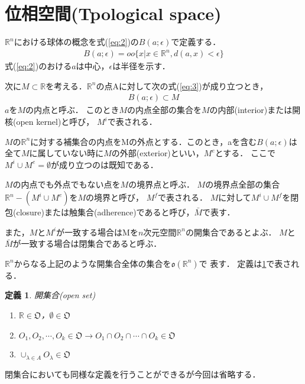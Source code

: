 \documentclass[11pt,a4j]{jarticle}
\newtheorem{dfn}{定義}
\begin{document}
\section{位相空間(Tpological space)} 
$\mathbb{R}^n$における球体の概念を式(\ref{eq:2})の$B(a;\epsilon)$で定義する．
\begin{eqnarray}
    \label{eq:2}
    B(a;\epsilon)=oo\{x|x\in \mathbb{R}^n,d(a,x)<\epsilon\}
\end{eqnarray}
式(\ref{eq:2})のおける$a$は中心，$\epsilon$は半径を示す．

次に$M\subset \mathbb{R}$を考える．$\mathbb{R}^n$の点Aに対して次の式(\ref{eq:3})が成り立つとき，
\begin{eqnarray}
    \label{eq:3}
    B(a;\epsilon) \subset M
\end{eqnarray}
$a$を$M$の内点と呼ぶ．
このとき$M$の内点全部の集合を$M$の内部(interior)または開核(open kernel)と呼び，
$M^i$で表される．

$M$の$\mathbb{R}^n$に対する補集合の内点をMの外点とする．このとき，aを含む$B(a;\epsilon)$は
全て$M$に属していない時に$M$の外部(exterior)といい，$M^e$とする．
ここで$M^i \cup M^e = \emptyset$が成り立つのは既知である．

$M$の内点でも外点でもない点を$M$の境界点と呼ぶ．
$M$の境界点全部の集合$\mathbb{R}^n-(M^i \cup M^e)$を$M$の境界と呼び，
$M^f$で表される．
$M$に対して$M^i \cup M^f$を閉包(closure)または触集合(adherence)であると呼び，$\bar{M}$で表す．

また，$M$と$M^i$が一致する場合はMを$n$次元空間$\mathbb{R}^n$の開集合であるとよぶ．
$M$と$\bar{M}$が一致する場合は閉集合であると呼ぶ．

$\mathbb{R}^n$からなる上記のような開集合全体の集合を$\mathfrak{o}(\mathbb{R}^n)$で
表す．
定義は\ref{pr:2}で表される．
\begin{dfn}
    開集合(open set)
    \label{pr:2}
    \begin{enumerate}
        \renewcommand{\labelenumi}{(\roman{enumi})}
        \item $\mathbb{R} \in \mathfrak{O}$，$\emptyset \in \mathfrak{O}$
        \item $O_1,O_2,\cdots,O_k \in \mathfrak{O} \rightarrow O_1 \cap O_2 \cap \cdots \cap O_k \in \mathfrak{O} $
        \item $\cup_{\lambda \in A} O_\lambda \in \mathfrak{O}$
    \end{enumerate} 
\end{dfn}
閉集合においても同様な定義を行うことができるが今回は省略する．
\end{document}
